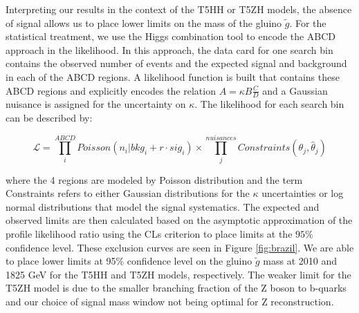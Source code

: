Interpreting our results in the context of the T5HH or T5ZH models, the absence of signal allows us to place lower limits on the mass of the gluino $\tilde{g}$. For the statistical treatment, we use the Higgs combination tool to encode the ABCD approach in the likelihood. In this approach, the data card for one search bin contains the observed number of events and the expected signal and background in each of the ABCD regions. A likelihood function is built that contains these ABCD regions and explicitly encodes the relation $A=\kappa B \frac{C}{D}$ and a Gaussian nuisance is assigned for the uncertainty on $\kappa$. The likelihood for each search bin can be described by:

\begin{equation}
\mathcal{L}=\prod^{ABCD}_{i} Poisson\left(n_i \vert bkg_i + r\cdot sig_i\right) \times \prod^{nuisances}_j Constraints\left(\theta_j , \hat{\theta}_j\right)
\end{equation}

where the 4 regions are modeled by Poisson distribution and the term Constraints refers to either Gaussian distributions for the $\kappa$ uncertainties or log normal distributions that model the signal systematics. The expected and observed limits are then calculated based on the asymptotic approximation of the profile likelihood ratio using the CLs criterion to place limits at the $95\%$ confidence level. These exclusion curves are seen in Figure \ref{fig:brazil}. We are able to place lower limits at 95\% confidence level on the gluino $\tilde{g}$ mass at 2010 and 1825 GeV for the T5HH and T5ZH models, respectively. The weaker limit for the T5ZH model is due to the smaller branching fraction of the Z boson to b-quarks and our choice of signal mass window not being optimal for Z reconstruction.

